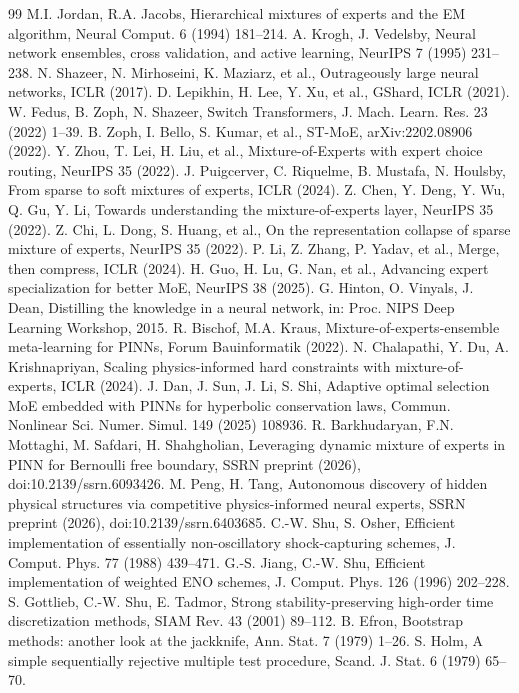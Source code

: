 \documentclass[preprint,12pt]{elsarticle}
\theoremstyle{remark}
\begin{document}
\begin{thebibliography}{99}
 M.I. Jordan, R.A. Jacobs, Hierarchical mixtures of experts and the EM algorithm, Neural Comput. 6 (1994) 181--214.
 A. Krogh, J. Vedelsby, Neural network ensembles, cross validation, and active learning, NeurIPS 7 (1995) 231--238.
 N. Shazeer, N. Mirhoseini, K. Maziarz, et al., Outrageously large neural networks, ICLR (2017).
 D. Lepikhin, H. Lee, Y. Xu, et al., GShard, ICLR (2021).
 W. Fedus, B. Zoph, N. Shazeer, Switch Transformers, J. Mach. Learn. Res. 23 (2022) 1--39.
 B. Zoph, I. Bello, S. Kumar, et al., ST-MoE, arXiv:2202.08906 (2022).
 Y. Zhou, T. Lei, H. Liu, et al., Mixture-of-Experts with expert choice routing, NeurIPS 35 (2022).
 J. Puigcerver, C. Riquelme, B. Mustafa, N. Houlsby, From sparse to soft mixtures of experts, ICLR (2024).
 Z. Chen, Y. Deng, Y. Wu, Q. Gu, Y. Li, Towards understanding the mixture-of-experts layer, NeurIPS 35 (2022).
 Z. Chi, L. Dong, S. Huang, et al., On the representation collapse of sparse mixture of experts, NeurIPS 35 (2022).
 P. Li, Z. Zhang, P. Yadav, et al., Merge, then compress, ICLR (2024).
 H. Guo, H. Lu, G. Nan, et al., Advancing expert specialization for better MoE, NeurIPS 38 (2025).
 G. Hinton, O. Vinyals, J. Dean, Distilling the knowledge in a neural network, in: Proc. NIPS Deep Learning Workshop, 2015.
 R. Bischof, M.A. Kraus, Mixture-of-experts-ensemble meta-learning for PINNs, Forum Bauinformatik (2022).
 N. Chalapathi, Y. Du, A. Krishnapriyan, Scaling physics-informed hard constraints with mixture-of-experts, ICLR (2024).
 J. Dan, J. Sun, J. Li, S. Shi, Adaptive optimal selection MoE embedded with PINNs for hyperbolic conservation laws, Commun. Nonlinear Sci. Numer. Simul. 149 (2025) 108936.
 R. Barkhudaryan, F.N. Mottaghi, M. Safdari, H. Shahgholian, Leveraging dynamic mixture of experts in PINN for Bernoulli free boundary, SSRN preprint (2026), doi:10.2139/ssrn.6093426.
 M. Peng, H. Tang, Autonomous discovery of hidden physical structures via competitive physics-informed neural experts, SSRN preprint (2026), doi:10.2139/ssrn.6403685.
 C.-W. Shu, S. Osher, Efficient implementation of essentially non-oscillatory shock-capturing schemes, J. Comput. Phys. 77 (1988) 439--471.
 G.-S. Jiang, C.-W. Shu, Efficient implementation of weighted ENO schemes, J. Comput. Phys. 126 (1996) 202--228.
 S. Gottlieb, C.-W. Shu, E. Tadmor, Strong stability-preserving high-order time discretization methods, SIAM Rev. 43 (2001) 89--112.
 B. Efron, Bootstrap methods: another look at the jackknife, Ann. Stat. 7 (1979) 1--26.
 S. Holm, A simple sequentially rejective multiple test procedure, Scand. J. Stat. 6 (1979) 65--70.
\end{thebibliography}
\end{document}
